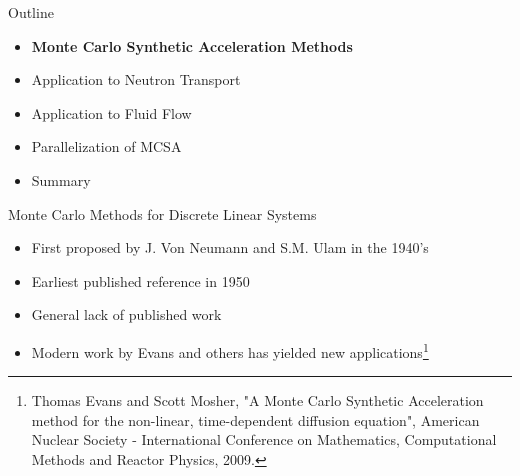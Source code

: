 \documentclass{beamer}
\begin{document}
\begin{frame}{Outline}

  \begin{itemize}
  \item \textbf{Monte Carlo Synthetic Acceleration Methods}
    \bigskip
  \item Application to Neutron Transport
    \bigskip
  \item Application to Fluid Flow
    \bigskip
  \item Parallelization of MCSA
    \bigskip
  \item Summary
  \end{itemize}

\end{frame}

\begin{frame}{Monte Carlo Methods for Discrete Linear Systems}

  \begin{itemize}
  \item First proposed by J. Von Neumann and S.M. Ulam in the 1940's
    \medskip \medskip
  \item Earliest published reference in 1950
    \medskip \medskip
  \item General lack of published work
    \medskip \medskip
  \item Modern work by Evans and others has yielded new
    applications\let\thefootnote\relax\footnote{\tiny{Thomas Evans and
        Scott Mosher, "A Monte Carlo Synthetic Acceleration method for
        the non-linear, time-dependent diffusion equation", American
        Nuclear Society - International Conference on Mathematics,
        Computational Methods and Reactor Physics, 2009.}}
  \end{itemize}
\end{frame}
\end{document}
